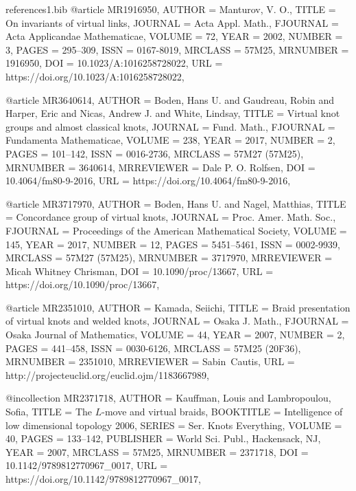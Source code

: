 \documentclass[11pt, reqno]{amsart}
\theoremstyle{definition}
\begin{document}
\begin{filecontents*}[overwrite]{references1.bib}
@article {MR1916950,
    AUTHOR = {Manturov, V. O.},
     TITLE = {On invariants of virtual links},
   JOURNAL = {Acta Appl. Math.},
  FJOURNAL = {Acta Applicandae Mathematicae},
    VOLUME = {72},
      YEAR = {2002},
    NUMBER = {3},
     PAGES = {295--309},
      ISSN = {0167-8019},
   MRCLASS = {57M25},
  MRNUMBER = {1916950},
       DOI = {10.1023/A:1016258728022},
       URL = {https://doi.org/10.1023/A:1016258728022},
}

@article {MR3640614,
    AUTHOR = {Boden, Hans U. and Gaudreau, Robin and Harper, Eric and Nicas,
              Andrew J. and White, Lindsay},
     TITLE = {Virtual knot groups and almost classical knots},
   JOURNAL = {Fund. Math.},
  FJOURNAL = {Fundamenta Mathematicae},
    VOLUME = {238},
      YEAR = {2017},
    NUMBER = {2},
     PAGES = {101--142},
      ISSN = {0016-2736},
   MRCLASS = {57M27 (57M25)},
  MRNUMBER = {3640614},
MRREVIEWER = {Dale P. O. Rolfsen},
       DOI = {10.4064/fm80-9-2016},
       URL = {https://doi.org/10.4064/fm80-9-2016},
}

@article {MR3717970,
    AUTHOR = {Boden, Hans U. and Nagel, Matthias},
     TITLE = {Concordance group of virtual knots},
   JOURNAL = {Proc. Amer. Math. Soc.},
  FJOURNAL = {Proceedings of the American Mathematical Society},
    VOLUME = {145},
      YEAR = {2017},
    NUMBER = {12},
     PAGES = {5451--5461},
      ISSN = {0002-9939},
   MRCLASS = {57M27 (57M25)},
  MRNUMBER = {3717970},
MRREVIEWER = {Micah Whitney Chrisman},
       DOI = {10.1090/proc/13667},
       URL = {https://doi.org/10.1090/proc/13667},
}

@article {MR2351010,
    AUTHOR = {Kamada, Seiichi},
     TITLE = {Braid presentation of virtual knots and welded knots},
   JOURNAL = {Osaka J. Math.},
  FJOURNAL = {Osaka Journal of Mathematics},
    VOLUME = {44},
      YEAR = {2007},
    NUMBER = {2},
     PAGES = {441--458},
      ISSN = {0030-6126},
   MRCLASS = {57M25 (20F36)},
  MRNUMBER = {2351010},
MRREVIEWER = {Sabin\ Cautis},
       URL = {http://projecteuclid.org/euclid.ojm/1183667989},
}

@incollection {MR2371718,
    AUTHOR = {Kauffman, Louis and Lambropoulou, Sofia},
     TITLE = {The {$L$}-move and virtual braids},
 BOOKTITLE = {Intelligence of low dimensional topology 2006},
    SERIES = {Ser. Knots Everything},
    VOLUME = {40},
     PAGES = {133--142},
 PUBLISHER = {World Sci. Publ., Hackensack, NJ},
      YEAR = {2007},
   MRCLASS = {57M25},
  MRNUMBER = {2371718},
       DOI = {10.1142/9789812770967\_0017},
       URL = {https://doi.org/10.1142/9789812770967_0017},
}


\end{filecontents*}
\end{document}
